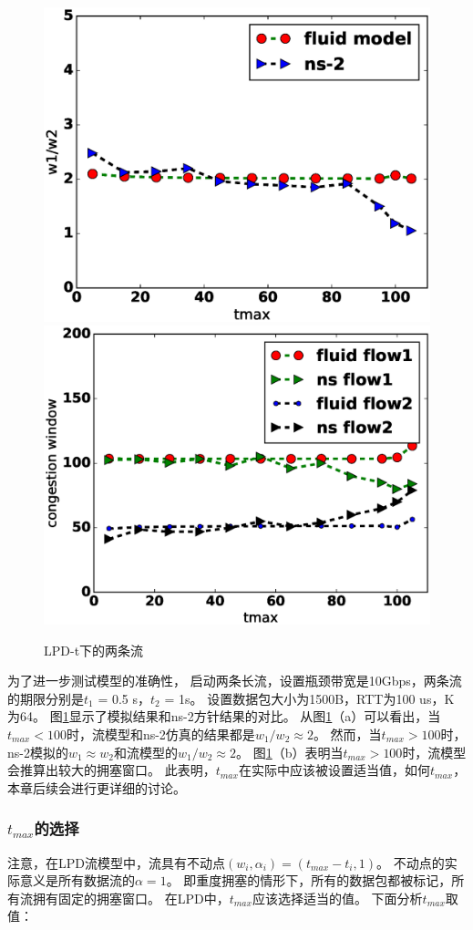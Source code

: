 \begin{figure}[h]
\centering
{}
 {\includegraphics[width=0.45\columnwidth]{figures/LPD/parameter/ratio.eps}}
{\includegraphics[width=0.45\columnwidth]{figures/LPD/parameter/window2.eps}}
\caption{LPD-t下的两条流}
\label{rate-ratio-fig}
\end{figure}



为了进一步测试模型的准确性，
启动两条长流，设置瓶颈带宽是10Gbps，两条流的期限分别是$t_1$ = 0.5 s，$t_2$ = 1s。
设置数据包大小为1500B，RTT为100 us，K为64。
图\ref{rate-ratio-fig}显示了模拟结果和ns-2方针结果的对比。
从图\ref{rate-ratio-fig}（a）可以看出，当$t_{max} <100$时，流模型和ns-2仿真的结果都是$w_1 /w_2 \approx 2$。
然而，当$t_{max}> 100$时，ns-2模拟的$w_1\approx w_2$和流模型的$w_1 /w_2 \approx  2$。
图\ref{rate-ratio-fig}（b）表明当$t_{max}> 100$时，流模型会推算出较大的拥塞窗口。
此表明，$t_{max}$在实际中应该被设置适当值，如何$t_{max}$，本章后续会进行更详细的讨论。



\subsubsection{$t_{max}$的选择}
注意，在LPD流模型中，流具有不动点$(w_i,\alpha_i)=(t_{max}-t_i,1)$。
不动点的实际意义是所有数据流的$\alpha= 1$。
即重度拥塞的情形下，所有的数据包都被标记，所有流拥有固定的拥塞窗口。
在LPD中，$t_{max}$应该选择适当的值。
下面分析$t_{max}$取值：

